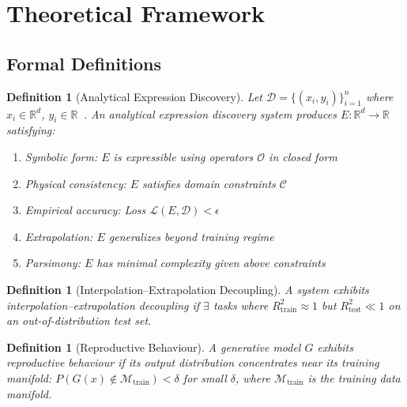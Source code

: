\documentclass[twoside,11pt]{article}
\newcommand{\Rtrain}{R^{2}_{\mathrm{train}}}
\newcommand{\Rtest}{R^{2}_{\mathrm{test}}}
\newtheorem{definition}[theorem]{Definition}
\begin{document}
\section{Theoretical Framework}
\label{sec:theory}

\subsection{Formal Definitions}
\label{sec:theory_defs}

\begin{definition}[Analytical Expression Discovery]
Let $\mathcal{D} = \{(x_i, y_i)\}_{i=1}^n$ where $x_i \in \mathbb{R}^d$, $y_i \in \mathbb{R}$~\citep{udrescu2020ai}. An analytical expression discovery system produces $E: \mathbb{R}^d \to \mathbb{R}$ satisfying:
\begin{enumerate}
  \item \textit{Symbolic form}: $E$ is expressible using operators $\mathcal{O}$ in closed form
  \item \textit{Physical consistency}: $E$ satisfies domain constraints $\mathcal{C}$
  \item \textit{Empirical accuracy}: Loss $\mathcal{L}(E, \mathcal{D}) < \epsilon$
  \item \textit{Extrapolation}: $E$ generalizes beyond training regime
  \item \textit{Parsimony}: $E$ has minimal complexity given above constraints
\end{enumerate}
\end{definition}

\begin{definition}[Interpolation--Extrapolation Decoupling]
\label{def:decoupling}
A system exhibits interpolation--extrapolation decoupling if $\exists$ tasks where $\Rtrain \approx 1$ but $\Rtest \ll 1$ on an out-of-distribution test set.
\end{definition}

\begin{definition}[Reproductive Behaviour]
\label{def:reproductive}
A generative model $G$ exhibits reproductive behaviour if its output distribution concentrates near its training manifold: $P(G(x) \notin \mathcal{M}_{\text{train}}) < \delta$ for small $\delta$, where $\mathcal{M}_{\text{train}}$ is the training data manifold.
\end{definition}
\end{document}
